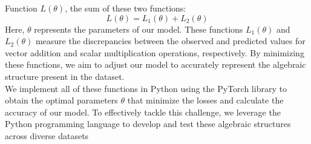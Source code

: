 \documentclass{article}
\begin{document}
\begin{frame}
Function $L(\theta)$, the sum of these two functions:
\[
L(\theta) = L_1(\theta) + L_2(\theta)
\]
Here, $\theta$ represents the parameters of 
our model. These functions $L_1(\theta)$ and
 $L_2(\theta)$ measure the discrepancies between 
 the observed and predicted values for vector addition 
 and scalar multiplication operations, respectively. 
 By minimizing these functions, we aim to adjust our 
 model to accurately represent the algebraic structure 
 present in the dataset. \\  

 We implement all of these functions 
 in Python using the PyTorch library 
 to obtain the optimal parameters $\theta$ 
 that minimize the losses and calculate 
 the accuracy of our model. To effectively
  tackle this challenge, we leverage 
  the Python programming language to 
  develop and test these algebraic 
  structures across diverse datasets




\end{frame}
\end{document}
